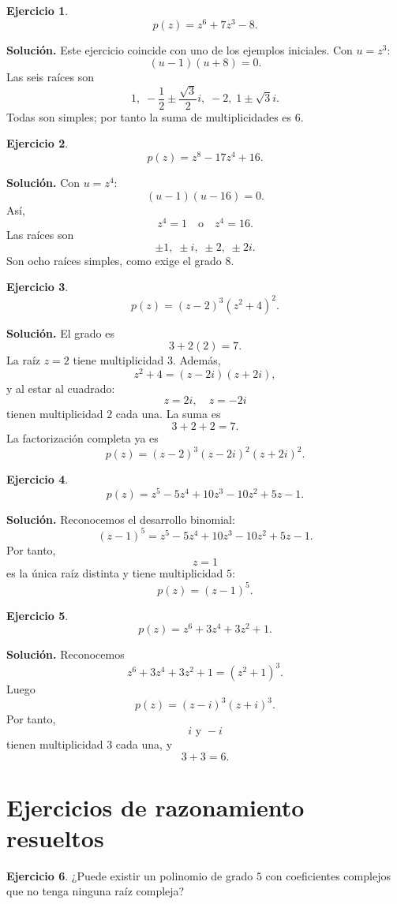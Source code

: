\documentclass[12pt]{article}
\theoremstyle{definition}
\newtheorem{ejercicio}{Ejercicio}[section]
\theoremstyle{remark}
\begin{document}
\begin{ejercicio}
\[
p(z)=z^6+7z^3-8.
\]
\end{ejercicio}

\textbf{Solución.}
Este ejercicio coincide con uno de los ejemplos iniciales. Con $u=z^3$:
\[
(u-1)(u+8)=0.
\]
Las seis raíces son
\[
1,\;
-\frac12\pm\frac{\sqrt3}{2}i,\;
-2,\;
1\pm\sqrt3 i.
\]
Todas son simples; por tanto la suma de multiplicidades es $6$.

\begin{ejercicio}
\[
p(z)=z^8-17z^4+16.
\]
\end{ejercicio}

\textbf{Solución.}
Con $u=z^4$:
\[
(u-1)(u-16)=0.
\]
Así,
\[
z^4=1\quad\text{o}\quad z^4=16.
\]
Las raíces son
\[
\boxed{\pm1,\;\pm i,\;\pm2,\;\pm2i.}
\]
Son ocho raíces simples, como exige el grado $8$.

\begin{ejercicio}
\[
p(z)=(z-2)^3(z^2+4)^2.
\]
\end{ejercicio}

\textbf{Solución.}
El grado es
\[
3+2(2)=7.
\]
La raíz $z=2$ tiene multiplicidad $3$. Además,
\[
z^2+4=(z-2i)(z+2i),
\]
y al estar al cuadrado:
\[
z=2i,\quad z=-2i
\]
tienen multiplicidad $2$ cada una. La suma es
\[
3+2+2=7.
\]
La factorización completa ya es
\[
\boxed{
p(z)=(z-2)^3(z-2i)^2(z+2i)^2.
}
\]

\begin{ejercicio}
\[
p(z)=z^5-5z^4+10z^3-10z^2+5z-1.
\]
\end{ejercicio}

\textbf{Solución.}
Reconocemos el desarrollo binomial:
\[
(z-1)^5
=z^5-5z^4+10z^3-10z^2+5z-1.
\]
Por tanto,
\[
\boxed{z=1}
\]
es la única raíz distinta y tiene multiplicidad $5$:
\[
\boxed{p(z)=(z-1)^5.}
\]

\begin{ejercicio}
\[
p(z)=z^6+3z^4+3z^2+1.
\]
\end{ejercicio}

\textbf{Solución.}
Reconocemos
\[
z^6+3z^4+3z^2+1=(z^2+1)^3.
\]
Luego
\[
p(z)=(z-i)^3(z+i)^3.
\]
Por tanto,
\[
\boxed{i\text{ y }-i}
\]
tienen multiplicidad $3$ cada una, y
\[
3+3=6.
\]

\section{Ejercicios de razonamiento resueltos}

\begin{ejercicio}
¿Puede existir un polinomio de grado $5$ con coeficientes complejos que no
tenga ninguna raíz compleja?
\end{ejercicio}
\end{document}
